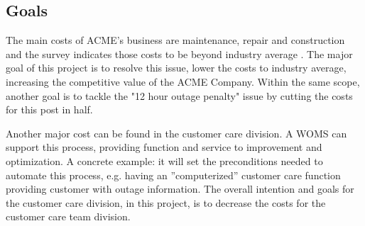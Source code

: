 \subsection{Goals}
The main costs of ACME's business are maintenance, repair and construction and the survey indicates those costs to be beyond industry average \cite{A}. The major goal of this project is to resolve this issue, lower the costs to industry average, increasing the competitive value of the ACME Company. Within the same scope, another goal is to tackle the "12 hour outage penalty" issue by cutting the costs for this post in half.

Another major cost can be found in the customer care division. A WOMS \cite{B} can support this process, providing function and service to improvement and optimization. A concrete example: it will set the preconditions needed to automate this process, e.g. having an ''computerized'' customer care function providing customer with outage information. The overall intention and goals for the customer care division, in this project, is to decrease the costs for the customer care team division.

